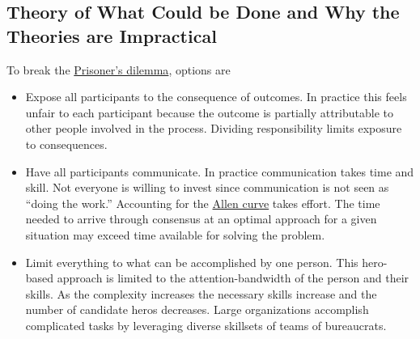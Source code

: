 \subsection*{Theory of What Could be Done and Why the Theories are Impractical}


To break the 
\href{https://en.wikipedia.org/wiki/Prisoner\%27s\_dilemma}{Prisoner's dilemma}, 
options are 
\begin{itemize}
    \item Expose all participants to the consequence of outcomes. In practice this feels unfair to each participant because the outcome is partially attributable to other people involved in the process. Dividing responsibility limits exposure to consequences.
    \item Have all participants communicate. In practice communication takes time and skill. Not everyone is willing to invest since communication is not seen as ``doing the work.'' Accounting for the \href{https://en.wikipedia.org/wiki/Allen\_curve}{Allen curve}
    takes effort. The time needed to arrive through consensus at an optimal approach for a given situation may exceed time available for solving the problem.
    \item Limit everything to what can be accomplished by one person. This hero-based approach is limited to the attention-bandwidth of the person and their skills. As the complexity increases the necessary skills increase and the number of candidate heros decreases. Large organizations accomplish complicated tasks by leveraging diverse skillsets of teams of bureaucrats.

\end{itemize}


 
 